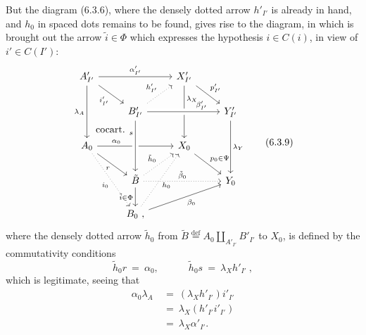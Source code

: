 \documentclass[11pt]{article}
\newcommand{\printedpage}[1]{\marginpar{\footnotesize p.~#1}}
\newcommand{\msp}[1]{\marginpar{\footnotesize [#1]}}
\begin{document}
\msp{page 113}But the diagram (6.3.6), where the densely dotted arrow $h'_{I'}$ is already in hand, and $h_0$ in spaced dots remains to be found, gives rise to the diagram, in which is brought out the arrow $\tilde{i} \in \Phi$ which expresses the hypothesis $i \in C(i)$, %
in view of $i' \in C(I')$:
\[
\begin{tikzcd}
A'_{I'} \arrow[rr, "\alpha'_{I'}"] \arrow[dr, "i'_{I'}"'] \arrow[dd, "\lambda_A"'] & & X'_{I'} \arrow[dr, "p'_{I'}"] \arrow[dd, "\lambda_X" near start] & \\
 & B'_{I'} \arrow[ur, dotted, "h'_{I'}"] \arrow[rr, crossing over, "\beta'_{I'}" near end] & & Y'_{I'} \arrow[dd, "\lambda_Y"] \\
A_0 \arrow[ur, phantom, "\text{cocart.}"] \arrow[rr, "\alpha_0" near start] \arrow[dr, "r"'] \arrow[ddr, dotted, "i_0"'] & & X_0 \arrow[dr, "p_0\in\Psi"] & \\
 & \tilde{B} \arrow[from=2-2, crossing over, "s"' near start] \arrow[ur, dotted, "\tilde{h}_0"] \arrow[rr, dotted, "\tilde{\beta}_0"] \arrow[d, "\tilde{i}\in\Phi"'] & & Y_0 \\
 & B_0\ , \arrow[uur, dotted, "h_0"'] \arrow[urr, "\beta_0"'] & &
\end{tikzcd}
\tag*{(6.3.9)}
\]
\printedpage{57}
where the densely dotted arrow $\tilde{h}_0$ from $\tilde{B} \overset{\text{def}}{=} A_0 \amalg_{A'_{I'}} B'_{I'}$ to $X_0$, is defined by the commutativity conditions
\[
\tilde{h}_0r \ =\ \alpha_0, \qquad\quad \tilde{h}_0s \ =\ \lambda_X h'_{I'}\ ,
\tag*{(6.3.10)}
\]
which is legitimate, seeing that
\[
\begin{aligned}
\alpha_0\lambda_A \ &=\ (\lambda_X h'_{I'})i'_{I'} \\
&=\ \lambda_X(h'_{I'}i'_{I'}) \\
&=\ \lambda_X\alpha'_{I'}.
\end{aligned}
\]
\end{document}
